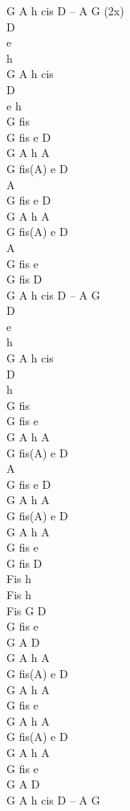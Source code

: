 \begin{chord}
G A h cis D – A G (2x)\\
D\\
e\\
h\\
G A h cis\\

D\\
e h\\
G fis\\
G fis e D\\

\vin G A h A\\
\vin G fis(A) e D\\
\vin A\\
\vin G fis e D\\

\vin G A h A\\
\vin G fis(A) e D\\
\vin A\\
\vin G fis e\\
\vin G fis D\\

\vin G A h cis D – A G\\
D\\
e\\
h\\
G A h cis\\

D\\
h\\
G fis\\
G fis e\\

\vin G A h A\\
\vin G fis(A) e D\\
\vin A\\
\vin G fis e D\\

\vin G A h A\\
\vin G fis(A) e D\\
\vin G A h A\\
\vin G fis e\\
\vin G fis D\\

Fis h\\
Fis h\\
Fis G D\\
G fis e\\
G A D\\

\vin G A h A\\
\vin G fis(A) e D\\
\vin G A h A\\
\vin G fis e\\

\vin G A h A\\
\vin G fis(A) e D\\
\vin G A h A\\
\vin G fis e\\
\vin G A D\\
G A h cis D – A G\\
\end{chord}
